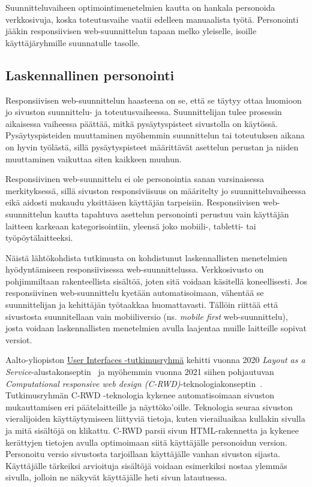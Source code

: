 \documentclass[finnish, 12pt, a4paper, elec, utf8, a-1b, online]{aaltothesis}
\begin{document}
Suunnitteluvaiheen optimointimenetelmien kautta on hankala personoida
verkkosivuja, koska toteutusvaihe vaatii edelleen manuaalista työtä. Personointi
jääkin responsiivisen web-suunnittelun tapaan melko yleiselle, isoille
käyttäjäryhmille suunnatulle tasolle.

\subsection{Laskennallinen personointi}

Responsiivisen web-suunnittelun haasteena on se, että se täytyy ottaa huomioon
jo sivuston suunnittelu- ja toteutusvaiheessa. Suunnittelijan tulee prosessin
aikaisessa vaiheessa päättää, mitkä pysäytyspisteet sivustolla on käytössä.
Pysäytyspisteiden muuttaminen myöhemmin suunnittelun tai toteutuksen aikana on
hyvin työlästä, sillä pysäytyspisteet määrittävät asettelun perustan ja niiden
muuttaminen vaikuttaa siten kaikkeen muuhun.

Responsiivinen web-suunnittelu ei ole personointia sanan varsinaisessa
merkityksessä, sillä sivuston responsiviisuus on määritelty jo
suunnitteluvaiheessa eikä aidosti mukaudu yksittäisen käyttäjän tarpeisiin.
Responsiivisen web-suunnittelun kautta tapahtuva asettelun personointi perustuu
vain käyttäjän laitteen karkeaan kategorisointiin, yleensä joko mobiili-,
tabletti- tai työpöytälaitteeksi.

Näistä lähtökohdista tutkimusta on kohdistunut laskennallisten menetelmien
hyödyntämiseen responsiivisessa web-suunnittelussa. Verkkosivusto on
pohjimmiltaan rakenteellista sisältöä, joten sitä voidaan käsitellä
koneellisesti. Jos responsiivinen web-suunnittelu kyetään automatisoimaan,
vähentää se suunnittelijan ja kehittäjän työtaakkaa huomattavasti. Tällöin
riittää että sivustosta suunnitellaan vain mobiiliversio (ns. \textit{mobile
first} web-suunnittelu), josta voidaan laskennallisten menetelmien avulla
laajentaa muille laitteille sopivat versiot.

Aalto-yliopiston \href{https://userinterfaces.aalto.fi/}{User Interfaces
-tutkimusryhmä} kehitti vuonna 2020 \textit{Layout as a
Service}-alustakonseptin~\cite{laine2020_laas} ja myöhemmin vuonna 2021 siihen
pohjautuvan \textit{Computational responsive web design
(C-RWD)}-teknologiakonseptin~\cite{laine2021responsive}. Tutkimusryhmän C-RWD
-teknologia kykenee automatisoimaan sivuston mukauttamisen eri päätelaitteille
ja näyttöko'oille. Teknologia seuraa sivuston vieralijoiden käyttäytymiseen
liittyviä tietoja, kuten vierailuaikaa kullakin sivulla ja mitä sisältöjä on
klikattu. C-RWD parsii sivun HTML-rakennetta ja kykenee kerättyjen tietojen
avulla optimoimaan siitä käyttäjälle personoidun version. Personoitu versio
sivustosta tarjoillaan käyttäjälle vanhan sivuston sijasta. Käyttäjälle
tärkeiksi arvioituja sisältöjä voidaan esimerkiksi nostaa ylemmäs sivulla,
jolloin ne näkyvät käyttäjälle heti sivun latautuessa.
\end{document}
